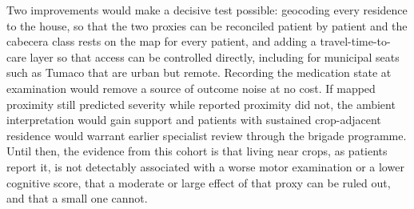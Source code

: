 \documentclass[11pt,a4paper]{article}
\begin{document}
Two improvements would make a decisive test possible: geocoding every residence to the house, so that the two proxies can be reconciled patient by patient and the cabecera class rests on the map for every patient, and adding a travel-time-to-care layer so that access can be controlled directly, including for municipal seats such as Tumaco that are urban but remote. Recording the medication state at examination would remove a source of outcome noise at no cost. If mapped proximity still predicted severity while reported proximity did not, the ambient interpretation would gain support and patients with sustained crop-adjacent residence would warrant earlier specialist review through the brigade programme. Until then, the evidence from this cohort is that living near crops, as patients report it, is not detectably associated with a worse motor examination or a lower cognitive score, that a moderate or large effect of that proxy can be ruled out, and that a small one cannot.



\end{document}

